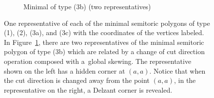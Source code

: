 \documentclass[10pt,a4paper]{amsart}
\numberwithin{equation}{section}
\theoremstyle{definition}
\theoremstyle{plain}
\theoremstyle{plain}
\begin{document}
\begin{figure}[t]
 \begin{subfigure}{.9\textwidth}
 \centering
 \caption{Minimal of type (3b) (two representatives)}
 \label{fig:stmin-3b}
 \end{subfigure}
 \caption{One representative of each of the minimal semitoric polygons of type (1), (2), (3a), and (3c) with the coordinates of the vertices labeled.
 In Figure~\ref{fig:stmin-3b}, there are two representatives of the minimal semitoric polygon of type (3b) which are related by a change of cut direction operation composed with a~global skewing. The representative shown on the left has a hidden corner at $(a,a)$. Notice that when the cut direction is changed away from the point $(a,a)$, in the representative on the right, a Delzant corner is revealed.}
 \label{fig:semitoric-polygon-examples}
\end{figure}
\end{document}
